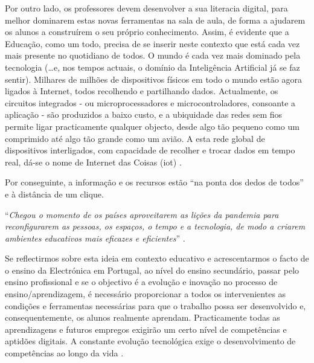 Por outro lado, os professores devem desenvolver a sua literacia digital, para melhor dominarem estas novas ferramentas na sala de aula, de forma a ajudarem os alunos a construírem o seu próprio conhecimento. Assim, é evidente que a Educação, como um todo, precisa de se inserir neste contexto que está cada vez mais presente no quotidiano de todos. O mundo é cada vez mais dominado pela tecnologia (\ldots e, nos tempos actuais, o domínio da Inteligência Artificial já se faz sentir). Milhares de milhões de dispositivos físicos em todo o mundo estão agora ligados à Internet, todos recolhendo e partilhando dados. Actualmente, os circuitos integrados - ou microprocessadores e microcontroladores, consoante a aplicação - são produzidos a baixo custo, e a ubiquidade das redes sem fios permite ligar practicamente qualquer objecto, desde algo tão pequeno como um comprimido até algo tão grande como um avião. A esta rede global de dispositivos interligados, com capacidade de recolher e trocar dados em tempo real, dá-se o nome de Internet das Coisas (\acrfull{iot}) \cite{IoT}.

Por conseguinte, a informação e os recursos estão “na ponta dos dedos de todos” e à distância de um clique.

\begin{center}
    ``\textit{Chegou o momento de os países aproveitarem as lições da pandemia para reconfigurarem as pessoas, os espaços, o tempo e a tecnologia, de modo a criarem ambientes educativos mais eficazes e eficientes}'' \cite{thestateofeducation}.
\end{center}

Se reflectirmos sobre esta ideia em contexto educativo e acrescentarmos o facto de o ensino da Electrónica em Portugal, ao nível do ensino secundário, passar pelo ensino profissional e se o objectivo é a evolução e inovação no processo de ensino/aprendizagem, é necessário proporcionar a todos os intervenientes as condições e ferramentas necessárias para que o trabalho possa ser desenvolvido e, consequentemente, os alunos realmente aprendam. Practicamente todas as aprendizagens e futuros empregos exigirão um certo nível de competências e aptidões digitais. A constante evolução tecnológica exige o desenvolvimento de competências ao longo da vida \cite{Digitale13:online}.

